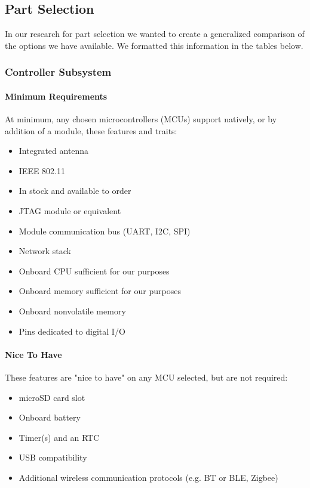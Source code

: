 \subsection{Part Selection}
In our research for part selection we wanted to create a generalized comparison of the options we have available. We formatted this information in the tables below.

\subsubsection{Controller Subsystem}\label{sec:ps-control}
\paragraph{Minimum Requirements} At minimum, any chosen microcontrollers (MCUs) support natively, or by addition of a module, these features and traits:
\begin{itemize}
	\item Integrated antenna
	\item IEEE 802.11
	\item In stock and available to order
	\item JTAG module or equivalent
	\item Module communication bus (UART, I2C, SPI)
	\item Network stack
	\item Onboard CPU sufficient for our purposes
	\item Onboard memory sufficient for our purposes
	\item Onboard nonvolatile memory
	\item Pins dedicated to digital I/O
\end{itemize}

\paragraph{Nice To Have} These features are "nice to have" on any MCU selected, but are not required:
\begin{itemize}
	\item microSD card slot
	\item Onboard battery
	\item Timer(s) and an RTC
	\item USB compatibility
	\item Additional wireless communication protocols (e.g. BT or BLE, Zigbee)
\end{itemize}


